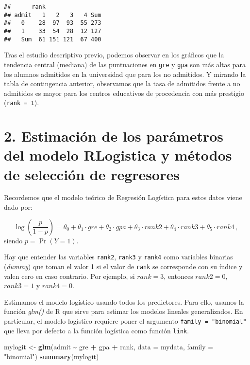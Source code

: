\documentclass[
]{article}
\newenvironment{Shaded}{\begin{snugshade}}{\end{snugshade}}
\newcommand{\AttributeTok}[1]{\textcolor[rgb]{0.13,0.29,0.53}{#1}}
\newcommand{\FunctionTok}[1]{\textcolor[rgb]{0.13,0.29,0.53}{\textbf{#1}}}
\newcommand{\NormalTok}[1]{#1}
\newcommand{\OtherTok}[1]{\textcolor[rgb]{0.56,0.35,0.01}{#1}}
\newcommand{\SpecialCharTok}[1]{\textcolor[rgb]{0.81,0.36,0.00}{\textbf{#1}}}
\newcommand{\StringTok}[1]{\textcolor[rgb]{0.31,0.60,0.02}{#1}}
\begin{document}
\begin{verbatim}
##      rank
## admit   1   2   3   4 Sum
##   0    28  97  93  55 273
##   1    33  54  28  12 127
##   Sum  61 151 121  67 400
\end{verbatim}

Tras el estudio descriptivo previo, podemos observar en los gráficos que
la tendencia central (mediana) de las puntuaciones en \texttt{gre} y
\texttt{gpa} son más altas para los alumnos admitidos en la universidad
que para los no admitidos. Y mirando la tabla de contingencia anterior,
observamos que la tasa de admitidos frente a no admitidos es mayor para
los centros educativos de procedencia con más prestigio
(\texttt{rank\ =\ 1}).

\hypertarget{estimaciuxf3n-de-los-paruxe1metros-del-modelo-rlogistica-y-muxe9todos-de-selecciuxf3n-de-regresores}{%
\section{2. Estimación de los parámetros del modelo RLogistica y métodos
de selección de
regresores}\label{estimaciuxf3n-de-los-paruxe1metros-del-modelo-rlogistica-y-muxe9todos-de-selecciuxf3n-de-regresores}}

Recordemos que el modelo teórico de Regresión Logística para estos datos
viene dado por:

\[
\log\left(\frac{p}{1-p} \right) =\theta_0+\theta_1 \cdot gre+\theta_2 \cdot gpa+\theta_3 \cdot rank2+\theta_4 \cdot rank3+\theta_5 \cdot rank4\, ,
\] siendo \(p=\Pr(Y=1)\).

Hay que entender las variables \texttt{rank2}, \texttt{rank3} y
\texttt{rank4} como variables binarias (\emph{dummy}) que toman el valor
1 si el valor de \texttt{rank} se corresponde con su índice y valen cero
en caso contrario. Por ejemplo, si \(rank=3\), entonces \(rank2=0\),
\(rank3=1\) y \(rank4=0\).

Estimamos el modelo logístico usando todos los predictores. Para ello,
usamos la función \emph{glm()} de R que sirve para estimar los modelos
lineales generalizados. En particular, el modelo logístico requiere
poner el argumento \texttt{family\ =\ "binomial"} que lleva por defecto
a la función logística como función \texttt{link}.

\begin{Shaded}
\begin{Highlighting}[]
\NormalTok{mylogit }\OtherTok{\textless{}{-}} \FunctionTok{glm}\NormalTok{(admit }\SpecialCharTok{\textasciitilde{}}\NormalTok{ gre }\SpecialCharTok{+}\NormalTok{ gpa }\SpecialCharTok{+}\NormalTok{ rank, }\AttributeTok{data =}\NormalTok{ mydata, }\AttributeTok{family =} \StringTok{"binomial"}\NormalTok{)}
\FunctionTok{summary}\NormalTok{(mylogit)}
\end{Highlighting}
\end{Shaded}
\end{document}
